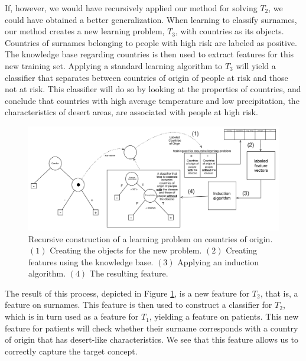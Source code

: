\documentclass[letterpaper]{article} %
\theoremstyle{definition}
\begin{document}
If, however, we would have recursively applied our method for solving $T_2$, we could have obtained a better generalization.
When learning to classify surnames, our method creates a new learning problem, $T_3$, with countries as its objects. Countries of surnames belonging to people with high risk are labeled as positive. The knowledge base regarding countries is then used to extract features for this new training set.
Applying a standard learning algorithm to $T_3$ will yield a classifier that separates between countries of origin of people at risk and those not at risk. This classifier will do so by looking at the properties of countries, and conclude that countries with high average temperature and low precipitation, the characteristics of desert areas, are associated with people at high risk.

\begin{figure}[th]
	\centering
	\includegraphics[width=1.0\linewidth,height=0.4\linewidth]{fig4_annotated.pdf}
	\caption{Recursive construction of a learning problem on countries of origin. $(1)$ Creating the objects for the new problem. $(2)$ Creating features using the knowledge base. $(3)$ Applying an induction algorithm. $(4)$ The resulting feature.}
	\label{fig:moving_to_lvl2}
\end{figure}

The result of this process, depicted in Figure \ref{fig:moving_to_lvl2}, is a new feature for $T_2$, that is, a feature on surnames. This feature is then used to construct a classifier for $T_2$, which is in turn used as a feature for $T_1$, yielding a feature on patients. This new feature for patients will check whether their surname corresponds with a country of origin that has desert-like characteristics. We see that this feature allows us to correctly capture the target concept.

\end{document}
